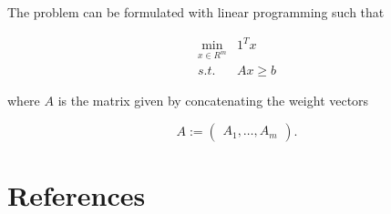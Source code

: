 \documentclass{article}
\begin{document}
The problem can be formulated with linear programming such that

\begin{equation}
    \begin{split}
        \min_{x \in R^m} & 1^Tx \\
        s.t. & Ax \geq b
    \end{split}
\end{equation}

\noindent where $A$ is the matrix given by concatenating the weight vectors

\begin{equation}
    A:=
    \begin{pmatrix}
        A_1, \ldots, A_m
    \end{pmatrix}.
\end{equation}


\newpage
\section{References}
\printbibliography[heading=none]
\end{document}

